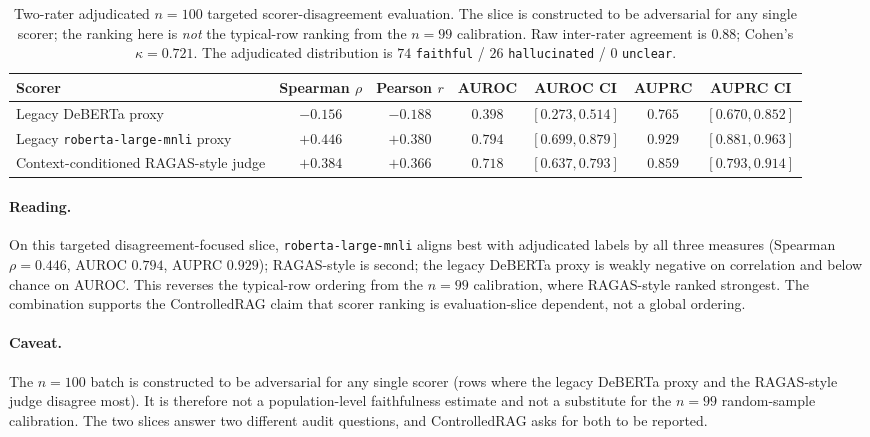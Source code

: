 \documentclass[11pt]{article}
\begin{document}
\begin{table}[!htb]
\centering
\caption{Two-rater adjudicated $n=100$ targeted scorer-disagreement
evaluation. The slice is constructed to be adversarial for any single
scorer; the ranking here is \emph{not} the typical-row ranking from
the $n=99$ calibration. Raw inter-rater agreement is $0.88$; Cohen's
$\kappa = 0.721$. The adjudicated distribution is $74$ \texttt{faithful}
/ $26$ \texttt{hallucinated} / $0$ \texttt{unclear}.}
\label{tab:supp:disagreement_alignment}
\footnotesize
\begin{tabular}{lcccccc}
\toprule
Scorer & Spearman $\rho$ & Pearson $r$ & AUROC & AUROC CI & AUPRC & AUPRC CI \\
\midrule
Legacy DeBERTa proxy             & $-0.156$ & $-0.188$ & $0.398$ & $[0.273, 0.514]$ & $0.765$ & $[0.670, 0.852]$ \\
Legacy \texttt{roberta-large-mnli} proxy & $+0.446$ & $+0.380$ & $0.794$ & $[0.699, 0.879]$ & $0.929$ & $[0.881, 0.963]$ \\
Context-conditioned RAGAS-style judge & $+0.384$ & $+0.366$ & $0.718$ & $[0.637, 0.793]$ & $0.859$ & $[0.793, 0.914]$ \\
\bottomrule
\end{tabular}
\end{table}

\paragraph{Reading.} On this targeted disagreement-focused slice,
\texttt{roberta-large-mnli} aligns best with adjudicated labels by all
three measures (Spearman $\rho = 0.446$, AUROC $0.794$, AUPRC $0.929$);
RAGAS-style is second; the legacy DeBERTa proxy is weakly negative on
correlation and below chance on AUROC. This reverses the typical-row
ordering from the $n=99$ calibration, where RAGAS-style ranked
strongest. The combination supports the ControlledRAG claim that
scorer ranking is evaluation-slice dependent, not a global ordering.

\paragraph{Caveat.} The $n=100$ batch is constructed to be adversarial
for any single scorer (rows where the legacy DeBERTa proxy and the
RAGAS-style judge disagree most). It is therefore not a population-level
faithfulness estimate and not a substitute for the $n=99$ random-sample
calibration. The two slices answer two different audit questions, and
ControlledRAG asks for both to be reported.
\end{document}
